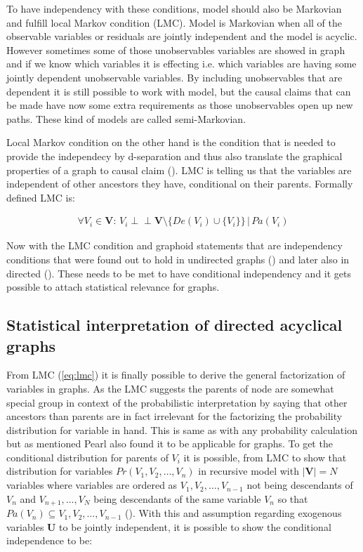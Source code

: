 \documentclass[main=english,12pt,a4paper,pdftex,econ,utf8]{aaltothesis}
\newcommand{\indep}{\perp \!\!\! \perp}
\newcommand{\pa}[1]{Pa(#1)}
\newcommand{\de}[1]{De(#1)}
\newcommand{\vars}{\bm{V}}
\newcommand{\unobs}{\bm{U}}
\begin{document}


To have independency with these conditions, model should also be Markovian and fulfill local Markov condition (LMC). Model is Markovian when all of the observable variables or residuals are jointly independent and the model is acyclic. However sometimes some of those unobservables variables are showed in graph and if we know which variables it is effecting i.e. which variables are having some jointly dependent unobservable variables. By including unobservables that are dependent it is still possible to work with model, but the causal claims that can be made have now some extra requirements as those unobservables open up new paths. These kind of models are called semi-Markovian.

Local Markov condition on the other hand is the condition that is needed to provide the independecy by d-separation and thus also translate the graphical properties of a graph to causal claim (\cite{Heckman2015}). LMC is telling us that the variables are independent of other ancestors they have, conditional on their parents. Formally defined LMC is:

\begin{gather} \label{eq:lmc}
    \forall V_{i}\in\vars\text{: }V_{i}\indep\vars\setminus\{\de{V_{i}}\cup \{V_{i}\}\}\,|\,\pa{V_{i}}
\end{gather}

Now with the LMC condition and graphoid statements that are independency conditions that were found out to hold in undirected graphs (\cite{Paz1985}) and later also in directed (\cite{Pearl1986}). These needs to be met to have conditional independency and it gets possible to attach statistical relevance for graphs.

\subsection{Statistical interpretation of directed acyclical graphs}

From LMC (\ref{eq:lmc}) it is finally possible to derive the general factorization of variables in graphs. As the LMC suggests the parents of node are somewhat special group in context of the probabilistic interpretation by saying that other ancestors than parents are in fact irrelevant for the factorizing the probability distribution for variable in hand. This is same as with any probability calculation but as mentioned Pearl also found it to be applicable for graphs. To get the conditional distribution for parents of $V_i$ it is possible, from LMC to show that distribution for variables $Pr(V_1,V_2,\ldots,V_n)$ in recursive model with $|\vars|=N$ variables where variables are ordered as $V_1,V_2,\ldots,V_{n-1}$ not being descendants of $V_n$ and $V_{n+1},\ldots,V_{N}$ being descendants of the same variable $V_n$ so that $\pa{V_n}\subseteq V_1,V_2,\ldots,V_{n-1}$ (\cite{Heckman2015}). With this and assumption regarding exogenous variables $\unobs$ to be jointly independent, it is possible to show the conditional independence to be:
\end{document}
